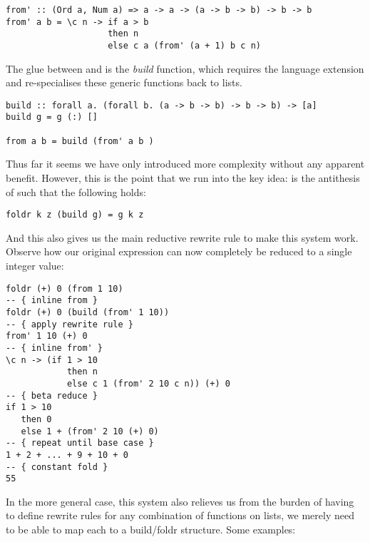 \begin{listing}[H]
\begin{verbatim}
from' :: (Ord a, Num a) => a -> a -> (a -> b -> b) -> b -> b
from' a b = \c n -> if a > b
                    then n
                    else c a (from' (a + 1) b c n)
\end{verbatim}
\end{listing}

The glue between  and  is the \textit{build} function, which requires the  language extension
and re-specialises these generic functions back to lists.

\begin{listing}[H]
\begin{verbatim}
build :: forall a. (forall b. (a -> b -> b) -> b -> b) -> [a]
build g = g (:) []

from a b = build (from' a b )
\end{verbatim}
\end{listing}

Thus far it seems we have only introduced more complexity without any apparent benefit. 
However, this is the point that we run into the key idea:  is the antithesis of  such that the following holds:

\begin{listing}[H]
\begin{verbatim}
foldr k z (build g) = g k z
\end{verbatim}
\end{listing}

And this also gives us the main reductive rewrite rule to make this system work. Observe how our original expression
can now completely be reduced to a single integer value:

\begin{listing}[H]
\begin{verbatim}
foldr (+) 0 (from 1 10)
-- { inline from }
foldr (+) 0 (build (from' 1 10))
-- { apply rewrite rule }
from' 1 10 (+) 0
-- { inline from' }
\c n -> (if 1 > 10
            then n
            else c 1 (from' 2 10 c n)) (+) 0
-- { beta reduce }
if 1 > 10
   then 0
   else 1 + (from' 2 10 (+) 0)
-- { repeat until base case }
1 + 2 + ... + 9 + 10 + 0
-- { constant fold }
55
\end{verbatim}
\end{listing}

In the more general case, this system also relieves us from the burden of having to
define rewrite rules for any combination of functions on lists, we merely need to be able to map each to a
build/foldr structure. Some examples:

